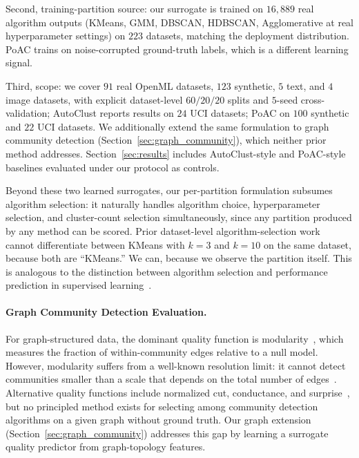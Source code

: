 \documentclass[10pt]{article} %
\begin{document}
Second, training-partition source: our surrogate is trained on $16{,}889$ real algorithm outputs (KMeans, GMM, DBSCAN, HDBSCAN, Agglomerative at real hyperparameter settings) on $223$ datasets, matching the deployment distribution. PoAC trains on noise-corrupted ground-truth labels, which is a different learning signal.

Third, scope: we cover $91$ real OpenML datasets, $123$ synthetic, $5$ text, and $4$ image datasets, with explicit dataset-level $60/20/20$ splits and $5$-seed cross-validation; AutoClust reports results on $24$ UCI datasets; PoAC on $100$ synthetic and $22$ UCI datasets. We additionally extend the same formulation to graph community detection (Section~\ref{sec:graph_community}), which neither prior method addresses. Section~\ref{sec:results} includes AutoClust-style and PoAC-style baselines evaluated under our protocol as controls.

Beyond these two learned surrogates, our per-partition formulation subsumes algorithm selection: it naturally handles algorithm choice, hyperparameter selection, and cluster-count selection simultaneously, since any partition produced by any method can be scored. Prior dataset-level algorithm-selection work~\citep{ferrari2015clustering, pimentel2019new} cannot differentiate between KMeans with $k{=}3$ and $k{=}10$ on the same dataset, because both are ``KMeans.'' We can, because we observe the partition itself. This is analogous to the distinction between algorithm selection and performance prediction in supervised learning~\citep{bischl2016aslib}.

\paragraph{Graph Community Detection Evaluation.}
For graph-structured data, the dominant quality function is modularity~\citep{newman2006modularity}, which measures the fraction of within-community edges relative to a null model. However, modularity suffers from a well-known resolution limit: it cannot detect communities smaller than a scale that depends on the total number of edges~\citep{fortunato2007resolution}. Alternative quality functions include normalized cut, conductance, and surprise~\citep{traag2015detecting}, but no principled method exists for selecting among community detection algorithms on a given graph without ground truth. Our graph extension (Section~\ref{sec:graph_community}) addresses this gap by learning a surrogate quality predictor from graph-topology features.
\end{document}
